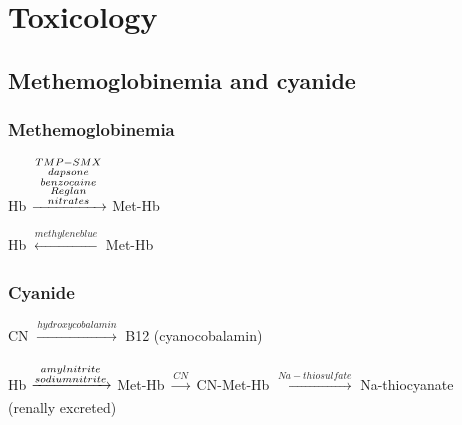 \documentclass[8pt]{extarticle}
\begin{document}
\newpage

\section{Toxicology}
\subsection{Methemoglobinemia and cyanide}
\subsubsection{Methemoglobinemia}
Hb $\xrightarrow[]{\begin{subarray}{c} TMP-SMX \\ dapsone \\ benzocaine \\ Reglan \\ nitrates \end{subarray}}$ Met-Hb

\vfill

Hb $\xleftarrow[]{methylene blue}$ Met-Hb

\vfill

\subsubsection{Cyanide}
CN $\xrightarrow[]{hydroxycobalamin}$ B12 (cyanocobalamin)

\vfill

Hb $\xrightarrow[]{\begin{subarray}{c} amyl nitrite \\ sodium nitrite \end{subarray}}$ Met-Hb $\xrightarrow[]{CN}$ CN-Met-Hb $\xrightarrow[]{Na-thiosulfate}$ Na-thiocyanate \\ (renally excreted)

\vfill
\end{document}
